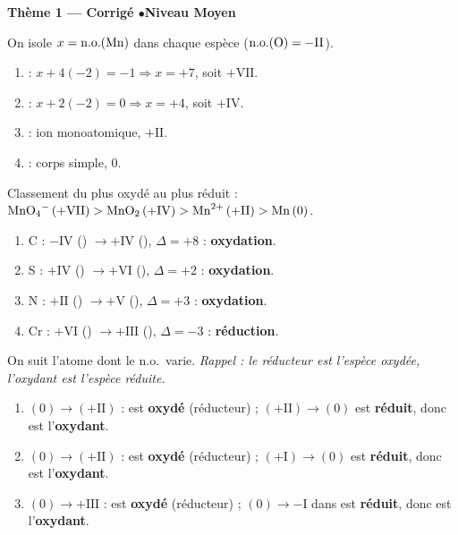 \documentclass[11pt,a4paper]{article}
\begin{document}
\begin{center}\color{primarydark}\large\bfseries Thème 1 — Corrigé \quad$\bullet$\quad Niveau Moyen\end{center}

\begin{corrige}
On isole $x=\mathrm{n.o.}(\ce{Mn})$ dans chaque espèce ($\mathrm{n.o.}(\ce{O})=-\mathrm{II}$).
\begin{enumerate}[label=\alph*)]
  \item {} : $x+4(-2)=-1\Rightarrow x=+7$, soit $+\mathrm{VII}$.
  \item {} : $x+2(-2)=0\Rightarrow x=+4$, soit $+\mathrm{IV}$.
  \item {} : ion monoatomique, $+\mathrm{II}$.
  \item {} : corps simple, $0$.
\end{enumerate}
Classement du plus oxydé au plus réduit : $\ce{MnO4^-}\,(+\mathrm{VII}) > \ce{MnO2}\,(+\mathrm{IV})
> \ce{Mn^{2+}}\,(+\mathrm{II}) > \ce{Mn}\,(0)$.
\end{corrige}

\begin{corrige}
\begin{enumerate}[label=\alph*)]
  \item C : $-\mathrm{IV}$ () $\to +\mathrm{IV}$ (), $\Delta=+8$ : \textbf{oxydation}.
  \item S : $+\mathrm{IV}$ () $\to +\mathrm{VI}$ (), $\Delta=+2$ : \textbf{oxydation}.
  \item N : $+\mathrm{II}$ () $\to +\mathrm{V}$ (), $\Delta=+3$ : \textbf{oxydation}.
  \item Cr : $+\mathrm{VI}$ () $\to +\mathrm{III}$ (), $\Delta=-3$ :
        \textbf{réduction}.
\end{enumerate}
\end{corrige}

\begin{corrige}
On suit l'atome dont le n.o.\ varie. \emph{Rappel : le réducteur est l'espèce oxydée, l'oxydant est
l'espèce réduite.}
\begin{enumerate}[label=\alph*)]
  \item {}$(0)\to$$(+\mathrm{II})$ :  est \textbf{oxydé} (réducteur) ;
        $(+\mathrm{II})\to$$(0)$ est \textbf{réduit}, donc  est
        l'\textbf{oxydant}.
  \item {}$(0)\to$$(+\mathrm{II})$ :  est \textbf{oxydé} (réducteur) ;
        $(+\mathrm{I})\to$$(0)$ est \textbf{réduit}, donc  est l'\textbf{oxydant}.
  \item {}$(0)\to +\mathrm{III}$ :  est \textbf{oxydé} (réducteur) ;
        $(0)\to -\mathrm{I}$ dans  est \textbf{réduit}, donc  est
        l'\textbf{oxydant}.
\end{enumerate}
\end{corrige}
\end{document}
